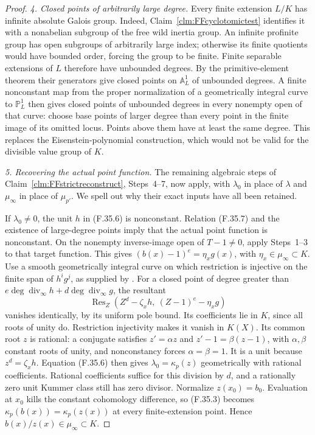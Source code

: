 \documentclass[11pt]{article}
\begin{document}
\begin{proof}
\emph{4. Closed points of arbitrarily large degree.}
Every finite extension \(L/K\) has infinite
absolute Galois group. Indeed,
Claim~\ref{clm:FFcyclotomictest} identifies it
with a nonabelian subgroup of the free wild
inertia group. An infinite profinite group
has open subgroups of arbitrarily large
index; otherwise its finite quotients would
have bounded order, forcing the group to
be finite. Finite separable extensions of
\(L\) therefore have unbounded degrees.
By the primitive-element theorem their
generators give closed points on
\(\mathbb A^1_L\) of unbounded degrees.
A finite nonconstant map from the proper
normalization of a geometrically integral
curve to \(\mathbb P^1_L\) then gives
closed points of unbounded degrees in
every nonempty open of that curve: choose
base points of larger degree than every
point in the finite image of its omitted
locus. Points above them have at least
the same degree. This replaces the
Eisenstein-polynomial construction, which
would not be valid for the divisible
value group of \(K\).

\emph{5. Recovering the actual point function.}
The remaining algebraic steps of
Claim~\ref{clm:FFstrictreconstruct}, Steps~4--7,
now apply, with \(\lambda_0\) in place of
\(\lambda\) and \(\mu_\infty\) in place of
\(\mu_{p'}\). We spell out why their exact
inputs have all been retained.

If \(\lambda_0\ne0\), the unit \(h\) in
(F.35.6) is nonconstant. Relation (F.35.7)
and the existence of large-degree points
imply that the actual point function is
nonconstant. On the nonempty inverse-image
open of \(T-1\ne0\), apply Steps~1--3 to
that target function. This gives
\((b(x)-1)^e=\eta_xg(x)\), with
\(\eta_x\in\mu_\infty\subset K\).
Use a smooth geometrically integral curve
on which restriction is injective on the
finite span of \(h^ig^j\), as supplied by
\citet[Theorem~1.8 and Corollary~1.9]{FF_CharlesPoonen2016}.
For a closed point of degree greater than
\(e\deg\operatorname{div}_\infty h+
d\deg\operatorname{div}_\infty g\), the
resultant
\[
        \operatorname{Res}_Z
          (Z^d-\zeta_xh,\ (Z-1)^e-\eta_xg)
\]
vanishes identically, by its uniform pole
bound. Its coefficients lie in \(K\),
since all roots of unity do. Restriction
injectivity makes it vanish in \(K(X)\).
Its common root \(z\) is rational: a
conjugate satisfies \(z'=\alpha z\) and
\(z'-1=\beta(z-1)\), with \(\alpha,\beta\)
constant roots of unity, and nonconstancy
forces \(\alpha=\beta=1\). It is a unit
because \(z^d=\zeta_xh\).
Equation (F.35.6) then gives
\(\lambda_0=\kappa_p(z)\) geometrically
with rational coefficients. Rational
coefficients suffice for this division
by \(d\), and a rationally zero unit
Kummer class still has zero divisor.
Normalize \(z(x_0)=b_0\). Evaluation at
\(x_0\) kills the constant cohomology
difference, so (F.35.3) becomes
\(\kappa_p(b(x))=\kappa_p(z(x))\)
at every finite-extension point. Hence
\(b(x)/z(x)\in\mu_\infty\subset K\).


\end{proof}
\end{document}
